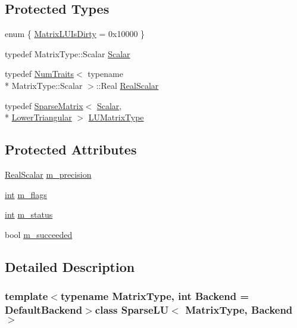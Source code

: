 \subsection*{Protected Types}
\begin{DoxyCompactItemize}
\item 
enum \{ \hyperlink{class_sparse_l_u_ae24c4bbe9625458772050a8cefa747e6a7db92998d2341577c9230aa6f1b2e3fd}{Matrix\-L\-U\-Is\-Dirty} = 0x10000
 \}
\item 
typedef Matrix\-Type\-::\-Scalar \hyperlink{class_sparse_l_u_a1c13b088bd115436caa27f0f8f0c26fd}{Scalar}
\item 
typedef \hyperlink{struct_num_traits}{Num\-Traits}$<$ typename \\*
Matrix\-Type\-::\-Scalar $>$\-::Real \hyperlink{class_sparse_l_u_a1090bc6ec27ebb0b088f6a1bf2ad6eab}{Real\-Scalar}
\item 
typedef \hyperlink{class_sparse_matrix}{Sparse\-Matrix}$<$ \hyperlink{class_sparse_l_u_a1c13b088bd115436caa27f0f8f0c26fd}{Scalar}, \\*
\hyperlink{_constants_8h_a9c6e15884c02c8075e3575670fe06894}{Lower\-Triangular} $>$ \hyperlink{class_sparse_l_u_a2a00945644909dbf287e5d3bb3e71867}{L\-U\-Matrix\-Type}
\end{DoxyCompactItemize}
\subsection*{Protected Attributes}
\begin{DoxyCompactItemize}
\item 
\hyperlink{class_sparse_l_u_a1090bc6ec27ebb0b088f6a1bf2ad6eab}{Real\-Scalar} \hyperlink{class_sparse_l_u_a489d44afaeb03a937be210f2356cfc8c}{m\-\_\-precision}
\item 
\hyperlink{ioapi_8h_a787fa3cf048117ba7123753c1e74fcd6}{int} \hyperlink{class_sparse_l_u_ad88d522e5b2a4f6d29b01553b6a54674}{m\-\_\-flags}
\item 
\hyperlink{ioapi_8h_a787fa3cf048117ba7123753c1e74fcd6}{int} \hyperlink{class_sparse_l_u_a4c892188136935ccaba41d1f60688e30}{m\-\_\-status}
\item 
bool \hyperlink{class_sparse_l_u_a6d8cbd9b21ff099a6eacf621171f13c6}{m\-\_\-succeeded}
\end{DoxyCompactItemize}


\subsection{Detailed Description}
\subsubsection*{template$<$typename Matrix\-Type, int Backend = Default\-Backend$>$class Sparse\-L\-U$<$ Matrix\-Type, Backend $>$}


